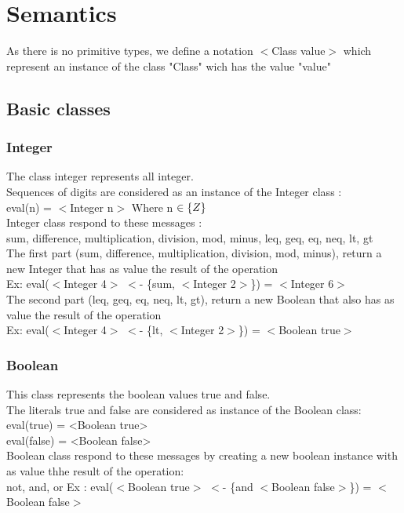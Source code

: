 \documentclass{eplDoc}
\begin{document}
\section{Semantics}
As there is no primitive types, we define a notation $<$Class value$>$ which represent an instance of the class "Class" wich has the value "value"
\subsection{Basic classes}
\subsubsection{Integer}
The class integer represents all integer.\\
Sequences of digits are considered as an instance of the Integer class :\\
eval(n) = $<$Integer n$>$ Where n $\in \mathbb\{Z\}$\\
Integer class respond to these messages :\\
sum, difference, multiplication, division, mod, minus, leq, geq, eq, neq, lt, gt\\
The first part (sum, difference, multiplication, division, mod, minus), return a new Integer that has as value the result of the operation\\
Ex: eval($<$Integer 4$>$ $<$- \{sum, $<$Integer 2$>$\}) = $<$Integer 6$>$\\
The second part (leq, geq, eq, neq, lt, gt), return a new Boolean that also has as value the result of the operation\\
Ex: eval($<$Integer 4$>$ $<$- \{lt, $<$Integer 2$>$\}) = $<$Boolean true$>$

\subsubsection{Boolean}
This class represents the boolean values true and false.\\
The literals true and false are considered as instance of the Boolean class:
eval(true) = <Boolean true>\\
eval(false) = <Boolean false>\\
Boolean class respond to these messages by creating a new boolean instance with as value thhe result of the operation:\\
not, and, or
Ex : eval($<$Boolean true$>$ $<$- \{and $<$Boolean false$>$\}) = $<$Boolean false$>$
\end{document}
